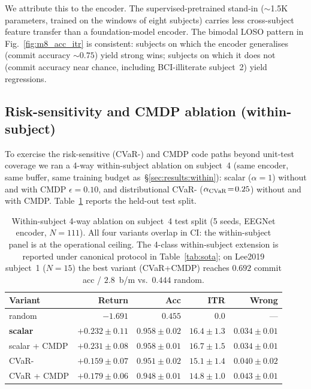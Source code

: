 We attribute this to the encoder. The supervised-pretrained
\eegnet{} stand-in ($\sim$1.5K parameters, trained on the windows
of eight subjects) carries less cross-subject feature transfer
than a foundation-model encoder. The bimodal LOSO pattern in
Fig.~\ref{fig:m8_acc_itr} is consistent: subjects on which the
encoder generalises (commit accuracy $\sim 0.75$) yield strong
\nettype{} wins; subjects on which it does not (commit accuracy
near chance, including BCI-illiterate subject~2) yield
regressions.

\subsection{Risk-sensitivity and CMDP ablation (within-subject)}\label{sec:results:cvar}

To exercise the risk-sensitive (CVaR-\cql{}) and CMDP code paths
beyond unit-test coverage we ran a 4-way within-subject ablation
on \bcib{} subject~4 (same encoder, same buffer, same training
budget as~\S\ref{sec:results:within}): scalar \cql{}
($\alpha\!=\!1$) without and with CMDP $\epsilon\!=\!0.10$, and
distributional CVaR-\cql{} ($\alpha_{\mathrm{CVaR}}\!=\!0.25$) without and
with CMDP. Table~\ref{tab:within_subject} reports the held-out
test split.

\begin{table}[t]
\centering
\caption{Within-subject 4-way ablation on \bcib{} subject~4 test
split (5 seeds, EEGNet encoder, $N\!=\!111$). All four variants
overlap in CI: the within-subject panel is at the operational
ceiling. The \bcia{} 4-class within-subject extension is reported
under canonical protocol in Table~\ref{tab:sota}; on Lee2019
subject~1 ($N\!=\!15$) the best variant (CVaR+CMDP) reaches
$0.692$ commit acc / $2.8$~b/m vs.\ $0.444$ random.}
\label{tab:within_subject}
\footnotesize
\setlength{\tabcolsep}{3pt}
\begin{tabular}{l r r r r}
\toprule
Variant & Return & Acc & ITR & Wrong \\
\midrule
random                & $-1.691$ & $0.455$ & $0.0$  & --- \\
\textbf{scalar \cql{}}& $\mathbf{+0.232 \!\pm\! 0.11}$ & $\mathbf{0.958 \!\pm\! 0.02}$ & $\mathbf{16.4 \!\pm\! 1.3}$ & $0.034 \!\pm\! 0.01$ \\
scalar + CMDP         & $+0.231 \!\pm\! 0.08$ & $0.958 \!\pm\! 0.01$ & $16.7 \!\pm\! 1.5$ & $0.034 \!\pm\! 0.01$ \\
CVaR-\cql{}           & $+0.159 \!\pm\! 0.07$ & $0.951 \!\pm\! 0.02$ & $15.1 \!\pm\! 1.4$ & $0.040 \!\pm\! 0.02$ \\
CVaR + CMDP           & $+0.179 \!\pm\! 0.06$ & $0.948 \!\pm\! 0.01$ & $14.8 \!\pm\! 1.0$ & $0.043 \!\pm\! 0.01$ \\
\bottomrule
\end{tabular}
\end{table}

